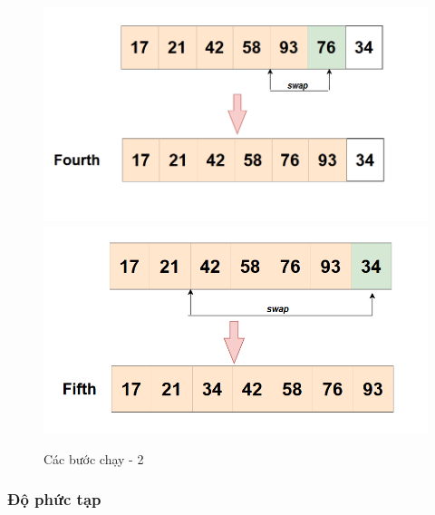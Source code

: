 \begin{figure}[H]
    \centering
    \includegraphics[width=1\linewidth]{img/Insertion sort/4.png}
    \vspace{0.5cm}
    \includegraphics[width=1\linewidth]{img/Insertion sort/5.png}
  
    \caption{Các bước chạy - 2}
    \label{fig:part2}
\end{figure}






\subsubsection{Độ phức tạp}